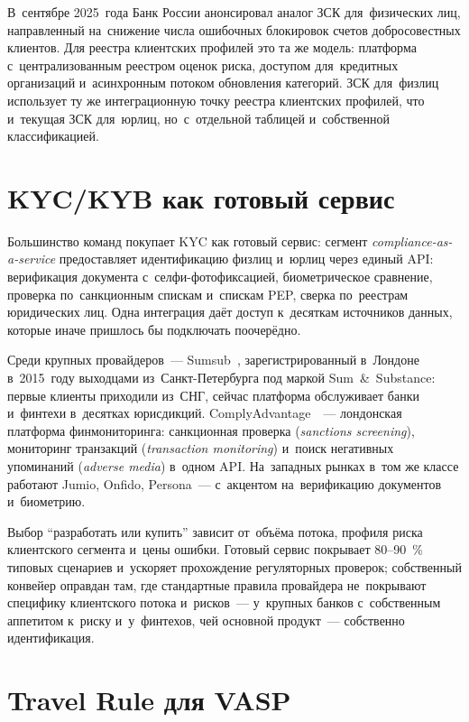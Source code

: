 В~сентябре 2025~года Банк России анонсировал аналог ЗСК для~физических лиц,
направленный на~снижение числа ошибочных блокировок счетов добросовестных
клиентов. Для реестра клиентских профилей это та же модель: платформа с~централизованным реестром
оценок риска, доступом для~кредитных организаций и~асинхронным потоком
обновления категорий. ЗСК для~физлиц использует ту же интеграционную точку реестра клиентских профилей,
что и~текущая ЗСК для~юрлиц, но~с~отдельной таблицей и~собственной
классификацией.

\section{KYC/KYB как готовый сервис}\label{sec:kyc-industry-providers}

Большинство команд покупает KYC как готовый сервис: сегмент
\textit{compliance-as-a-service} предоставляет идентификацию физлиц и~юрлиц через
единый API: верификация документа с~селфи-фотофиксацией, биометрическое
сравнение, проверка по~санкционным спискам и~спискам PEP, сверка по~реестрам
юридических лиц. Одна интеграция даёт доступ к~десяткам источников данных,
которые иначе пришлось бы подключать поочерёдно.

Среди крупных провайдеров~--- Sumsub~\cite{sumsub-overview}, зарегистрированный
в~Лондоне в~2015~году выходцами из~Санкт-Петербурга под маркой
Sum~\&~Substance: первые клиенты приходили из~СНГ, сейчас платформа обслуживает
банки и~финтехи в~десятках юрисдикций.
ComplyAdvantage~\cite{complyadvantage-overview}~--- лондонская платформа
финмониторинга: санкционная проверка (\textit{sanctions screening}),
мониторинг транзакций (\textit{transaction monitoring}) и~поиск негативных
упоминаний (\textit{adverse media}) в~одном API. На~западных рынках в~том же
классе работают Jumio, Onfido, Persona~--- с~акцентом на~верификацию документов
и~биометрию.

Выбор \enquote{разработать или купить} зависит от~объёма потока, профиля риска
клиентского сегмента и~цены ошибки. Готовый сервис покрывает 80--90~\% типовых
сценариев и~ускоряет прохождение регуляторных проверок; собственный конвейер
оправдан там, где стандартные правила провайдера не~покрывают
специфику клиентского потока и~рисков~--- у~крупных банков с~собственным аппетитом
к~риску и~у~финтехов, чей основной продукт~--- собственно идентификация.

\section{{Travel} {Rule} для {VASP}}\label{sec:kyc-travel-rule}

